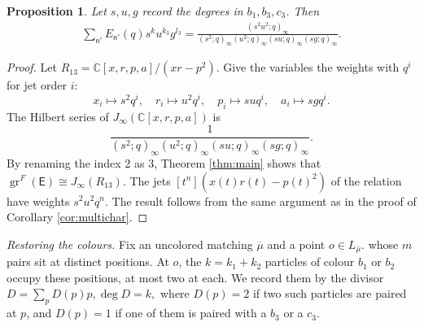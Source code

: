 \documentclass[11pt]{amsart}
\newtheorem{proposition}[theorem]{Proposition}
\theoremstyle{definition}
\theoremstyle{remark}
\begin{document}
\begin{proposition}\label{prop:uncolouredformula}
Let $s,u,g$ record the degrees in $b_1,b_3,c_3$. Then
\begin{align*}
	\sum_{\mathsf{n}'}E_{\mathsf{n}'}(q)s^ku^{k_3}g^{l_3}=\frac{(s^2u^2;q)_\infty}{(s^2;q)_{\infty}(u^2;q)_{\infty}(su;q)_{\infty}(sg;q)_{\infty}}.
\end{align*}
\end{proposition}
\begin{proof}
Let $R_{13}=\mathbb{C}[x,r,p,a]/(xr-p^2)$. Give the variables the weights with $q^i$ for jet order $i$:
\[x_i\mapsto s^2q^i,\quad r_i\mapsto u^2q^i,\quad p_i\mapsto suq^i,\quad a_i\mapsto sgq^i.\]
The Hilbert series of $J_{\infty}(\mathbb{C}[x,r,p,a])$ is 
\[\frac{1}{(s^2;q)_{\infty}(u^2;q)_{\infty}(su;q)_{\infty}(sg;q)_{\infty}}.\]
By renaming the index 2 as 3, Theorem \ref{thm:main} shows that $\operatorname{gr}^F(\mathsf E)\cong J_{\infty}(R_{13})$. The jets $[t^n](x(t)r(t)-p(t)^2)$ of the relation have weights $s^2u^2q^n$. The result follows from the same argument as in the proof of Corollary \ref{cor:multichar}.
\end{proof}
 \medskip\noindent\textit{Restoring the colours.}
 Fix an uncolored matching $\overline{\mu}$ and a point $o\in L_{\overline{\mu}}$. whose $m$ pairs sit at distinct positions. At $o$, the $k=k_1+k_2$ particles of colour $b_1$ or $b_2$ occupy these positions, at most two at each. We record them by the divisor
$D=\sum_p D(p)p, \deg D=k,$
where $D(p)=2$ if two such particles are paired at $p$, and $D(p)=1$ if one of them is paired with a $b_3$ or a $c_3$. 
\end{document}
